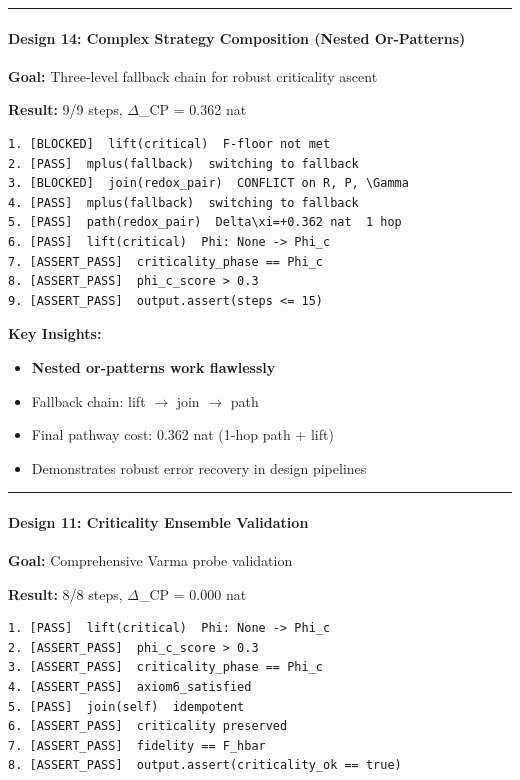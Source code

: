 \documentclass[12pt,a4paper]{article}
\begin{document}
\begin{center}
\rule{0.5\textwidth}{0.4pt}
\end{center}

\paragraph{Design 14: Complex Strategy Composition (Nested Or-Patterns) }

\textbf{Goal:} Three-level fallback chain for robust criticality ascent

\textbf{Result:} 9/9 steps, $\Delta$\xi\_CP = 0.362 nat

\begin{lstlisting}
1. [BLOCKED]  lift(critical)  F-floor not met
2. [PASS]  mplus(fallback)  switching to fallback
3. [BLOCKED]  join(redox_pair)  CONFLICT on R, P, \Gamma
4. [PASS]  mplus(fallback)  switching to fallback
5. [PASS]  path(redox_pair)  Delta\xi=+0.362 nat  1 hop
6. [PASS]  lift(critical)  Phi: None -> Phi_c
7. [ASSERT_PASS]  criticality_phase == Phi_c
8. [ASSERT_PASS]  phi_c_score > 0.3
9. [ASSERT_PASS]  output.assert(steps <= 15)
\end{lstlisting}

\textbf{Key Insights:}

\begin{itemize}
    \item \textbf{Nested or-patterns work flawlessly}
    \item Fallback chain: lift $\rightarrow$ join $\rightarrow$ path
    \item Final pathway cost: 0.362 nat (1-hop path + lift)
    \item Demonstrates robust error recovery in design pipelines
\end{itemize}

\begin{center}
\rule{0.5\textwidth}{0.4pt}
\end{center}

\paragraph{Design 11: Criticality Ensemble Validation }

\textbf{Goal:} Comprehensive Varma probe validation

\textbf{Result:} 8/8 steps, $\Delta$\xi\_CP = 0.000 nat

\begin{lstlisting}
1. [PASS]  lift(critical)  Phi: None -> Phi_c
2. [ASSERT_PASS]  phi_c_score > 0.3
3. [ASSERT_PASS]  criticality_phase == Phi_c
4. [ASSERT_PASS]  axiom6_satisfied
5. [PASS]  join(self)  idempotent
6. [ASSERT_PASS]  criticality preserved
7. [ASSERT_PASS]  fidelity == F_hbar
8. [ASSERT_PASS]  output.assert(criticality_ok == true)
\end{lstlisting}
\end{document}
